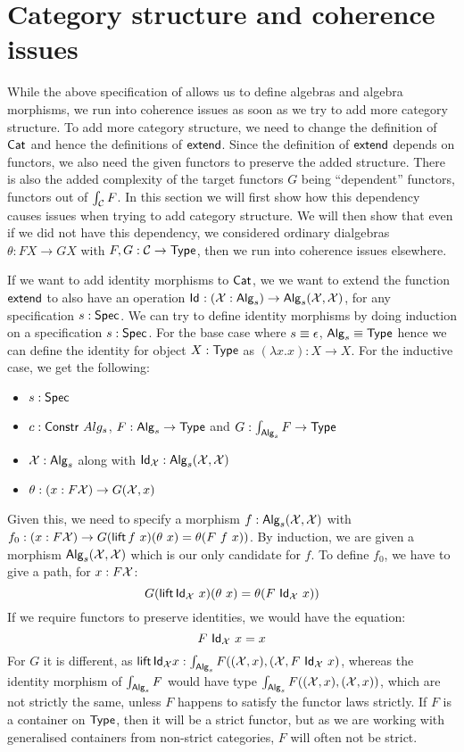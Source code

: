 \documentclass[a4paper,10pt]{report}
\begin{document}

\section{Category structure and coherence issues}
\label{sec:hitscategory}

While the above specification of \hits allows us to define algebras
and algebra morphisms, we run into coherence issues as soon as we try
to add more category structure. To add more category structure, we
need to change the definition of $\mathsf{Cat}$ and hence the definitions of
$\mathsf{extend}$. Since the definition of $\mathsf{extend}$ depends on functors, we
also need the given functors to preserve the added structure. There is
also the added complexity of the target functors $G$ being
``dependent'' functors, \ie functors out of $\int_{\mathcal{C}} F$. In this
section we will first show how this dependency causes issues when
trying to add category structure. We will then show that even if we
did not have this dependency, \ie we considered ordinary dialgebras
$\theta : F X \to G X$ with $F, G : \mathcal{C} \to \mathsf{Type}$, then we run into
coherence issues elsewhere.

If we want to add identity morphisms to $\mathsf{Cat}$, we we want to extend
the function $\mathsf{extend}$ to also have an operation
$\mathsf{Id}_{} : (\mathcal{X} : \mathsf{Alg}_s) \to \mathsf{Alg}_s(\mathcal{X},\mathcal{X})$, for any
specification $s : \mathsf{Spec}$. We can try to define identity morphisms by
doing induction on a specification $s : \mathsf{Spec}$. For the base case
where $s \equiv \epsilon$, $\mathsf{Alg}_s \equiv \mathsf{Type}$ hence we can define
the identity for object $X : \mathsf{Type}$ as $(\lambda x . x) : X \to X$. For
the inductive case, we get the following:
%
\begin{itemize}
\item $s : \mathsf{Spec}$ 
\item $c : \mathsf{Constr}\ Alg_s$, \ie $F : \mathsf{Alg}_s \to \mathsf{Type}$ and $G : \int_{\mathsf{Alg}_s} F \to \mathsf{Type}$
\item $\mathcal{X} : \mathsf{Alg}_s$ along with
  $\mathsf{Id}_{\mathcal{X}} : \mathsf{Alg}_s (\mathcal{X},\mathcal{X})$
\item  $\theta : (x : F \mathcal{X}) \to G (\mathcal{X}, x)$
\end{itemize}
%
Given this, we need to specify a morphism
$f : \mathsf{Alg}_s (\mathcal{X},\mathcal{X})$ with
$f_0 : (x : F \alg{X}) \to G (\lift f\ x) (\theta\ x) = \theta (F\ f\
x))$.
By induction, we are given a morphism $\mathsf{Alg}_s (\mathcal{X},\mathcal{X})$ which
is our only candidate for $f$. To define $f_0$, we have to give a path, for $x : F \mathcal{X}$:
$$
G (\operatorname{\mathsf{lift}} \mathsf{Id}_{\mathcal{X}}\ x) (\theta\ x) = \theta (F\ \mathsf{Id}_{\mathcal{X}}\ x))
$$
If we require functors to preserve identities, we would have the equation:
$$
F\ \mathsf{Id}_{\mathcal{X}}\ x = x
$$
For $G$ it is different, as
$\operatorname{\mathsf{lift}} \mathsf{Id}_{\mathcal{X}} x : \int_{\mathsf{Alg}_s} F ((\mathcal{X},x), (\mathcal{X}, F\
\mathsf{Id}_{\mathcal{X}}\ x)$,
whereas the identity morphism of $\int_{\mathsf{Alg}_s} F$ would have type
$\int_{\mathsf{Alg}_s} F ((\mathcal{X},x),(\mathcal{X},x))$, which are not
strictly the same, unless $F$ happens to satisfy the functor
laws strictly. If $F$ is a container on $\mathsf{Type}$, then it will be a
strict functor, but as we are working with generalised containers from
non-strict categories, $F$ will often not be strict.
\end{document}
